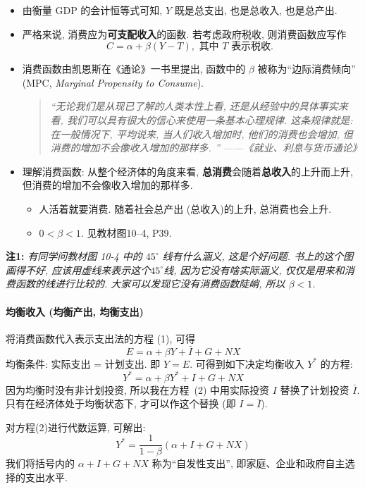 \documentclass[11pt]{ctexart}
\begin{document}
\begin{itemize}
\item
  由衡量 GDP 的会计恒等式可知, $Y$ 既是总支出, 也是总收入, 也是总产出.
\item
  严格来说, 消费应为\textbf{可支配收入}的函数. 若考虑政府税收, 则消费函数应写作
$$
C = \alpha + \beta  (Y-T),  \text{ 其中 $T$ 表示税收. }
$$
\item 
  消费函数由凯恩斯在《通论》一书里提出, 函数中的 $\beta$ 被称为``边际消费倾向'' (MPC, \textit{Marginal Propensity to Consume}).
  \begin{quote}
    {\it ``无论我们是从现已了解的人类本性上看, 还是从经验中的具体事实来看, 我们可以具有很大的信心来使用一条基本心理规律. 这条规律就是: 在一般情况下, 平均说来, 当人们收入增加时, 他们的消费也会增加, 但消费的增加不会像收入增加的那样多. '' ——《就业、利息与货币通论》}
  \end{quote}
  
\item
  理解消费函数: 从整个经济体的角度来看, \textbf{总消费}会随着\textbf{总收入}的上升而上升, 但消费的增加不会像收入增加的那样多.
  \begin{itemize}
  \item
    人活着就要消费. 随着社会总产出 (总收入)的上升, 总消费也会上升. 
  \item
    $ 0 < \beta < 1$. 见教材图10--4, P39.
  \end{itemize}
\end{itemize}

\begin{framed}
\textbf{注1:} \textit{有同学问教材图 10-4 中的 $45^\circ$ 线有什么涵义, 这是个好问题. 书上的这个图画得不好, 应该用虚线来表示这个$45^\circ$线, 因为它没有啥实际涵义, 仅仅是用来和消费函数的线进行比较的. 
大家可以发现它没有消费函数陡峭, 所以 $\beta < 1$.}
\end{framed}

\paragraph{均衡收入 (均衡产出, 均衡支出)}
将消费函数代入表示支出法的方程  (1),  可得
\[ E = \alpha + \beta Y + \bar{I} + G + NX\]
均衡条件: 实际支出 = 计划支出. 即 $Y=E$. 可得到如下决定均衡收入 $Y^*$
的方程: 
\[Y^* = \alpha + \beta Y^* + {I} + G + NX \tag{2}\]
因为均衡时没有非计划投资, 所以我在方程~(2) 中用实际投资 $I$ 替换了计划投资 $\bar{I}$. 只有在经济体处于均衡状态下, 才可以作这个替换 (即 $I = \bar{I}$).

对方程(2)进行代数运算, 可解出:
\[Y^* = \frac{1}{1-\beta}  (\alpha + {I} + G + NX) \tag{3}\]
我们将括号内的 $\alpha + I + G + NX$
称为``自发性支出'', 即家庭、企业和政府自主选择的支出水平. 
\end{document}
